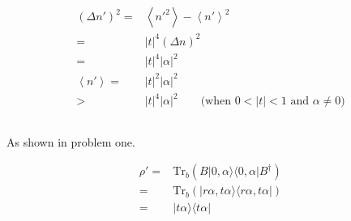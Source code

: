 \documentclass[10pt,fleqn]{article}
\newcommand{\Tr}{\mathrm{Tr}}
\newcommand{\eqar}[1]
{
  \begin{align*}
    #1
  \end{align*}
}
\newcommand{\paren}[1]{{\left({#1}\right)}}
\newcommand{\abs}[1]{{\left|{#1}\right|}}
\newcommand{\angl}[1]{{\left\langle{#1}\right\rangle}}
\begin{document}
\section{}
\subsection{}
\eqar{
  \paren{\Delta n'}^2=&\angl{{n'}^2}-\angl{n'}^2\\
  =&\abs{t}^4\paren{\Delta n}^2\\
  =&\abs{t}^4\abs{\alpha}^2\\
  \angl{n'}=&\abs{t}^2\abs{\alpha}^2\\
  >&\abs{t}^4\abs{\alpha}^2\qquad\text{(when $0<\abs{t}<1$ and $\alpha\neq0$)}
}
\subsection{}
As shown in problem one.
\eqar{
  \rho'=&\Tr_b\paren{B|0, \alpha\rangle\langle0, \alpha|B^\dagger}\\
  =&\Tr_b\paren{|r\alpha, t\alpha\rangle\langle r\alpha, t\alpha|}\\
  =&|t\alpha\rangle\langle t\alpha|
}

\section{}
\subsection{}
\subsection{}
\subsection{}
\subsection{}

\section{}
\subsection{}
\subsection{}
\subsection{}
\subsection{}
\subsection{}
\end{document}
